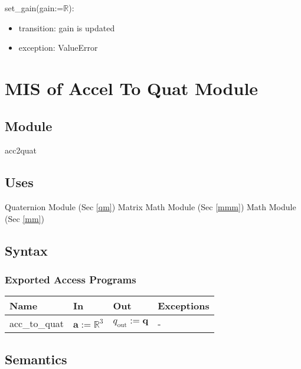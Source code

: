 \documentclass[12pt, titlepage]{article}
\begin{document}
\noindent set\_gain(gain:=$\mathbb{R}$):
\begin{itemize}
\item transition: gain is updated
\item exception: ValueError
\end{itemize}



\newpage

\section{MIS of Accel To Quat Module} \label{iqewomm}

\subsection{Module}
acc2quat

\subsection{Uses}
Quaternion Module (Sec \ref{qm})\newline
Matrix Math Module (Sec \ref{mmm}) \newline
Math Module (Sec \ref{mm})

\subsection{Syntax}

\subsubsection{Exported Access Programs}

\begin{center}
\begin{tabular}{p{2cm} p{4cm} p{4cm} p{2cm}}
\hline
\textbf{Name} & \textbf{In} & \textbf{Out} & \textbf{Exceptions} \\
\hline
acc\_to\_quat & $\mathbf{a}:=\mathbb{R}^3$ & $q_\text{out} := \mathbf{q}$ & - \\
\hline
\end{tabular}
\end{center}

\subsection{Semantics}
\end{document}

